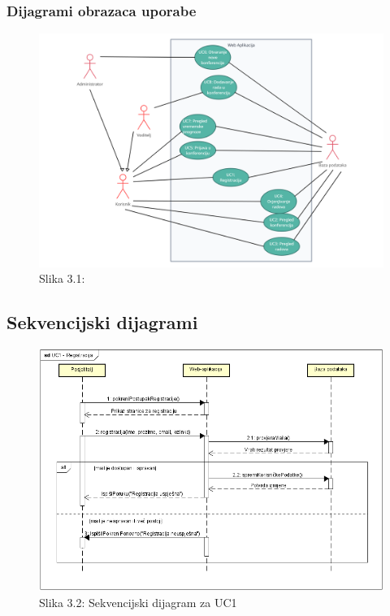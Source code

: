 				
					
				\subsubsection{Dijagrami obrazaca uporabe}
					
		\begin{figure}[H]
			\includegraphics[scale=0.55]{slike/UML1.JPG} 
			\centering
			\caption{Slika 3.1: }
			\label{UML1}
		\end{figure}		
				
			\subsection{Sekvencijski dijagrami}
				
		\begin{figure}[H]
			\includegraphics[scale=0.7]{slike/UC1.PNG} 
			\centering
			\caption{Slika 3.2: Sekvencijski dijagram za UC1}
			\label{fig:UC1}
		\end{figure}	

